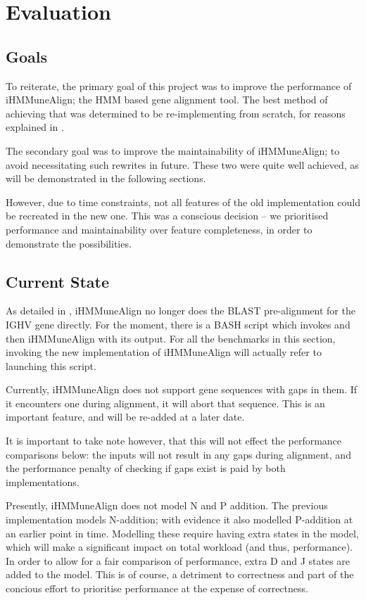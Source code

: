 \chapter{Evaluation}\label{ch:eval}

\section{Goals}
To reiterate, the primary goal of this project was to improve the performance of iHMMuneAlign; the HMM based gene alignment tool. The best method of achieving that was determined to be re-implementing from scratch, for reasons explained in .

The secondary goal was to improve the maintainability of iHMMuneAlign; to avoid necessitating such rewrites in future. These two were quite well achieved, as will be demonstrated in the following sections.

However, due to time constraints, not all features of the old implementation could be recreated in the new one. This was a conscious decision -- we prioritised performance and maintainability over feature completeness, in order to demonstrate the possibilities.


\section{Current State}
As detailed in , iHMMuneAlign no longer does the BLAST pre-alignment for the IGHV gene directly. For the moment, there is a BASH script which invokes  and then iHMMuneAlign with its output. For all the benchmarks in this section, invoking the new implementation of iHMMuneAlign will actually refer to launching this script.

Currently, iHMMuneAlign does not support gene sequences with gaps in them. If it encounters one during alignment, it will abort that sequence. This is an important feature, and will be re-added at a later date. 

It is important to take note however, that this will not effect the performance comparisons below: the inputs will not result in any gaps during alignment, and the performance penalty of checking if gaps exist is paid by both implementations.

Presently, iHMMuneAlign does not model N and P addition. The previous implementation models N-addition; with evidence it also modelled P-addition at an earlier point in time.
Modelling these require having extra states in the model, which will make a significant impact on total workload (and thus, performance). In order to allow for a fair comparison of performance, extra D and J states are added to the model. This is of course, a detriment to correctness and part of the concious effort to prioritise performance at the expense of correctness.


